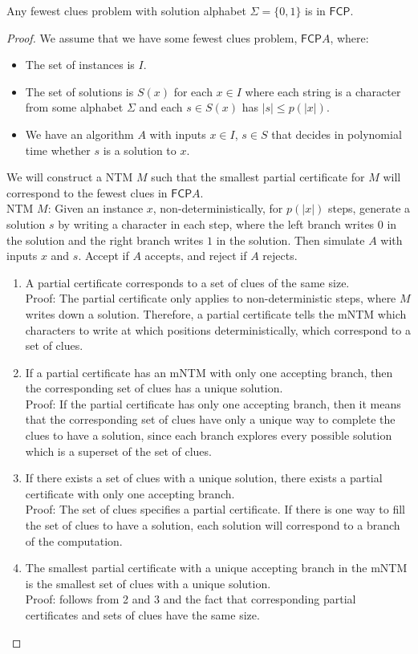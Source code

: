 \documentclass[runningheads,a4paper]{llncs}
\begin{document}
\begin{proposition}
Any fewest clues problem with solution alphabet $\Sigma = \{ 0 ,1 \}$ is in $\mathsf{FCP}$.
\end{proposition}

\begin{proof}
We assume that we have some fewest clues problem, $\mathsf{FCP} A$, where:
\begin{itemize}
\item The set of instances is $I$.
\item The set of solutions is $S(x)$ for each $x \in I$ where each string is a character from some alphabet $\Sigma$ and each $s \in S(x)$ has $|s| \leq p(|x|)$.
\item We have an algorithm $A$ with inputs $x \in I$, $s \in S$ that decides in polynomial time whether $s$ is a solution to $x$.
\end{itemize}
We will construct a NTM $M$ such that the smallest partial certificate for $M$ will correspond to the fewest clues in $\mathsf{FCP} A$. \\
NTM $M$: Given an instance $x$, non-deterministically, for $p(|x|)$ steps, generate a solution $s$ by writing a character in each step, where the left branch writes $0$ in the solution and the right branch writes $1$ in the solution. Then simulate $A$ with inputs $x$ and $s$. Accept if $A$ accepts, and reject if $A$ rejects. 
\begin{enumerate}
\item A partial certificate corresponds to a set of clues of the same size.\\
Proof: The partial certificate only applies to non-deterministic steps, where $M$ writes down a solution. Therefore, a partial certificate tells the mNTM which characters to write at which positions deterministically, which correspond to a set of clues.
\item If a partial certificate has an mNTM with only one accepting branch, then the corresponding set of clues has a unique solution.\\
Proof: If the partial certificate has only one accepting branch, then it means that the corresponding set of clues have only a unique way to complete the clues to have a solution, since each branch explores every possible solution which is a superset of the set of clues.
\item If there exists a set of clues with a unique solution, there exists a partial certificate with only one accepting branch.\\
Proof: The set of clues specifies a partial certificate. If there is one way to fill the set of clues to have a solution, each solution will correspond to a branch of the computation. 
\item The smallest partial certificate with a unique accepting branch in the mNTM is the smallest set of clues with a unique solution.\\
Proof: follows from 2 and 3 and the fact that corresponding partial certificates and sets of clues have the same size. 
\end{enumerate}
\end{proof}
\end{document}
